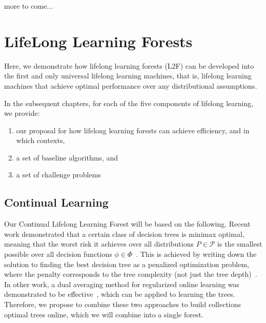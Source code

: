 \documentclass{article}
\begin{document}



\clearpage
\appendix

more to come...

\section{LifeLong Learning Forests}

Here, we demonstrate how lifelong learning forests (L2F) can be developed into the first and only universal lifelong learning machines, that is, lifelong learning machines that achieve optimal performance over any distributional assumptions.

In the subsequent chapters,  for each of the five components of lifelong learning, we provide:
\begin{enumerate}
    \item our proposal for how lifelong learning forests can achieve efficiency, and in which contexts,
    \item a set of baseline algorithms, and
    \item a set of challenge problems
\end{enumerate}

\subsection{Continual Learning}

Our Continual Lifelong Learning Forest will be based on the following.  Recent work demonstrated that a certain class of decision trees is minimax optimal, meaning that the worst risk it achieves over all distributions $P \in \mathcal{P}$ is the smallest possible over all decision functions $\phi \in \Phi$~\cite{Scott2006-oo}.  This is achieved by writing down the solution to finding the best decision tree as a penalized optimization problem, where the penalty corresponds to the tree complexity (not just the tree depth)~\cite{Scott2005-ho}. In other work, a dual averaging method for regularized online learning was demonstrated to be effective~\cite{Xiao2010-gv}, which can be applied to learning the trees. Therefore, we propose to combine these two approaches to build collections optimal trees online, which we will combine into a single forest. 
\end{document}
